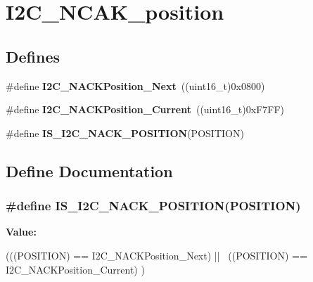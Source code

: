 \hypertarget{group__I2C__NCAK__position}{
\section{I2C\_\-NCAK\_\-position}
\label{group__I2C__NCAK__position}
}
\subsection*{Defines}
\begin{DoxyCompactItemize}
\item 
\hypertarget{group__I2C__NCAK__position_gacb512a4bd4841a763b6ec51606687fca}{
\#define {\bfseries I2C\_\-NACKPosition\_\-Next}~((uint16\_\-t)0x0800)}
\label{group__I2C__NCAK__position_gacb512a4bd4841a763b6ec51606687fca}

\item 
\hypertarget{group__I2C__NCAK__position_ga8d91c1e62730a9d927ca8e9ec4f7ef8f}{
\#define {\bfseries I2C\_\-NACKPosition\_\-Current}~((uint16\_\-t)0xF7FF)}
\label{group__I2C__NCAK__position_ga8d91c1e62730a9d927ca8e9ec4f7ef8f}

\item 
\#define {\bfseries IS\_\-I2C\_\-NACK\_\-POSITION}(POSITION)
\end{DoxyCompactItemize}


\subsection{Define Documentation}
\hypertarget{group__I2C__NCAK__position_ga631b4b1674a12aa2b3b27360983029e3}{
\subsubsection[{IS\_\-I2C\_\-NACK\_\-POSITION}]{\setlength{\rightskip}{0pt plus 5cm}\#define IS\_\-I2C\_\-NACK\_\-POSITION(POSITION)}}
\label{group__I2C__NCAK__position_ga631b4b1674a12aa2b3b27360983029e3}
{\bfseries Value:}
\begin{DoxyCode}
(((POSITION) == I2C_NACKPosition_Next) || \
                                         ((POSITION) == I2C_NACKPosition_Current)
      )
\end{DoxyCode}
